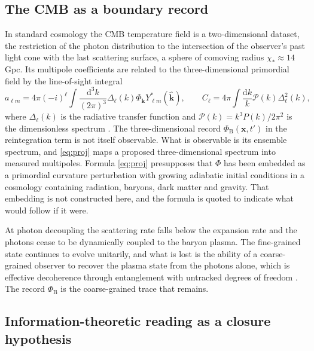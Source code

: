 \documentclass[11pt]{article}
\theoremstyle{definition}
\theoremstyle{remark}
\newcommand{\dd}{\mathrm{d}}
\newcommand{\xx}{\mathbf{x}}
\newcommand{\Phib}{{\Phi_{\mathrm{B}}}}
\newcommand{\Pk}{\mathcal{P}}
\begin{document}
\subsection{The CMB as a boundary record}

In standard cosmology the CMB temperature field is a two-dimensional dataset, the restriction of the photon distribution to the intersection of the observer's past light cone with the last scattering surface, a sphere of comoving radius $\chi_*\approx14$ Gpc. Its multipole coefficients are related to the three-dimensional primordial field by the line-of-sight integral
\begin{equation}
a_{\ell m}=4\pi(-i)^\ell\int\frac{\dd^3k}{(2\pi)^3}\Delta_\ell(k)\Phi_{\mathbf k}Y^*_{\ell m}(\hat{\mathbf k}),\qquad C_\ell=4\pi\int\frac{\dd k}{k}\Pk(k)\Delta_\ell^2(k),
\label{eq:proj}
\end{equation}
where $\Delta_\ell(k)$ is the radiative transfer function and $\Pk(k)=k^3P(k)/2\pi^2$ is the dimensionless spectrum \cite{hu2002}. The three-dimensional record $\Phib(\xx,t')$ in the reintegration term is not itself observable. What is observable is its ensemble spectrum, and \eqref{eq:proj} maps a proposed three-dimensional spectrum into measured multipoles. Formula \eqref{eq:proj} presupposes that $\Phi$ has been embedded as a primordial curvature perturbation with growing adiabatic initial conditions in a cosmology containing radiation, baryons, dark matter and gravity. That embedding is not constructed here, and the formula is quoted to indicate what would follow if it were.

At photon decoupling the scattering rate falls below the expansion rate and the photons cease to be dynamically coupled to the baryon plasma. The fine-grained state continues to evolve unitarily, and what is lost is the ability of a coarse-grained observer to recover the plasma state from the photons alone, which is effective decoherence through entanglement with untracked degrees of freedom \cite{zurek2003}. The record $\Phib$ is the coarse-grained trace that remains.

\subsection{Information-theoretic reading as a closure hypothesis}\label{sec:info}
\end{document}
